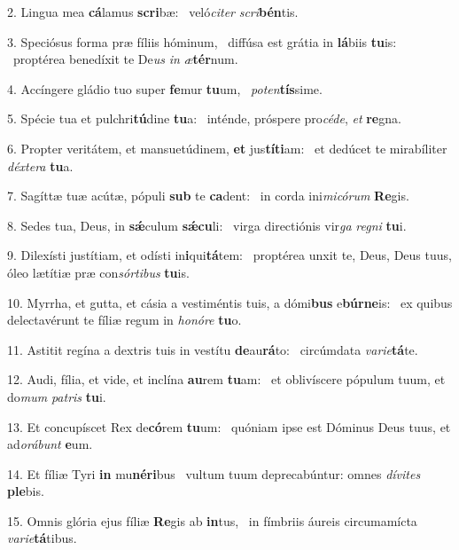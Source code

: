 2. Lingua mea \textbf{cá}lamus \textbf{scri}bæ: \ast\  veló\textit{ci}\textit{ter} \textit{scri}\textbf{bén}tis.\

3. Speciósus forma præ fíliis hóminum, \dag\  diffúsa est grátia in \textbf{lá}biis \textbf{tu}is: \ast\  proptérea benedíxit te De\textit{us} \textit{in} \textit{æ}\textbf{tér}num.\

4. Accíngere gládio tuo super \textbf{fe}mur \textbf{tu}um, \ast\  \textit{pot}\textit{en}\textbf{tís}sime.\

5. Spécie tua et pulchri\textbf{tú}dine \textbf{tu}a: \ast\  inténde, próspere pro\textit{cé}\textit{de}, \textit{et} \textbf{re}gna.\

6. Propter veritátem, et mansuetúdinem, \textbf{et} jus\textbf{tí}\textbf{ti}am: \ast\  et dedúcet te mirabíliter \textit{déx}\textit{te}\textit{ra} \textbf{tu}a.\

7. Sagíttæ tuæ acútæ, pópuli \textbf{sub} te \textbf{ca}dent: \ast\  in corda ini\textit{mi}\textit{có}\textit{rum} \textbf{Re}gis.\

8. Sedes tua, Deus, in \textbf{sǽ}culum \textbf{sǽ}\textbf{cu}li: \ast\  virga directiónis vir\textit{ga} \textit{re}\textit{gni} \textbf{tu}i.\

9. Dilexísti justítiam, et odísti in\textbf{i}qui\textbf{tá}tem: \ast\  proptérea unxit te, Deus, Deus tuus, óleo lætítiæ præ con\textit{sór}\textit{ti}\textit{bus} \textbf{tu}is.\

10. Myrrha, et gutta, et cásia a vestiméntis tuis, a dómi\textbf{bus} e\textbf{búr}\textbf{ne}is: \ast\  ex quibus delectavérunt te fíliæ regum in \textit{ho}\textit{nó}\textit{re} \textbf{tu}o.\

11. Astitit regína a dextris tuis in vestítu \textbf{de}au\textbf{rá}to: \ast\  circúmdata \textit{va}\textit{ri}\textit{e}\textbf{tá}te.\

12. Audi, fília, et vide, et inclína \textbf{au}rem \textbf{tu}am: \ast\  et oblivíscere pópulum tuum, et do\textit{mum} \textit{pa}\textit{tris} \textbf{tu}i.\

13. Et concupíscet Rex de\textbf{có}rem \textbf{tu}um: \ast\  quóniam ipse est Dóminus Deus tuus, et ad\textit{o}\textit{rá}\textit{bunt} \textbf{e}um.\

14. Et fíliæ Tyri \textbf{in} mu\textbf{né}\textbf{ri}bus \ast\  vultum tuum deprecabúntur: omnes \textit{dí}\textit{vi}\textit{tes} \textbf{ple}bis.\

15. Omnis glória ejus fíliæ \textbf{Re}gis ab \textbf{in}tus, \ast\  in fímbriis áureis circumamícta \textit{va}\textit{ri}\textit{e}\textbf{tá}tibus.\

